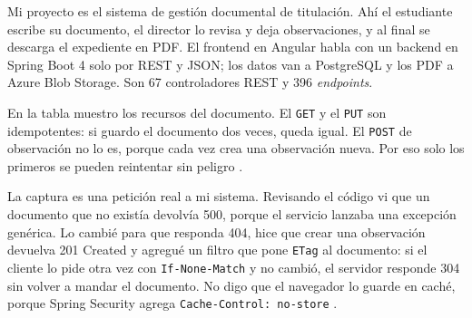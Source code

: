 Mi proyecto es el sistema de gestión documental de titulación. Ahí el estudiante escribe su documento, el director lo revisa y deja observaciones, y al final se descarga el expediente en PDF. El frontend en Angular habla con un backend en Spring Boot 4 solo por REST y JSON; los datos van a PostgreSQL y los PDF a Azure Blob Storage. Son 67 controladores REST y 396 \emph{endpoints}.

En la tabla muestro los recursos del documento. El \texttt{GET} y el \texttt{PUT} son idempotentes: si guardo el documento dos veces, queda igual. El \texttt{POST} de observación no lo es, porque cada vez crea una observación nueva. Por eso solo los primeros se pueden reintentar sin peligro \cite{rfc9110}.

La captura es una petición real a mi sistema. Revisando el código vi que un documento que no existía devolvía 500, porque el servicio lanzaba una excepción genérica. Lo cambié para que responda 404, hice que crear una observación devuelva 201 Created y agregué un filtro que pone \texttt{ETag} al documento: si el cliente lo pide otra vez con \texttt{If-None-Match} y no cambió, el servidor responde 304 sin volver a mandar el documento. No digo que el navegador lo guarde en caché, porque Spring Security agrega \texttt{Cache-Control: no-store} \cite{rfc9111}.
